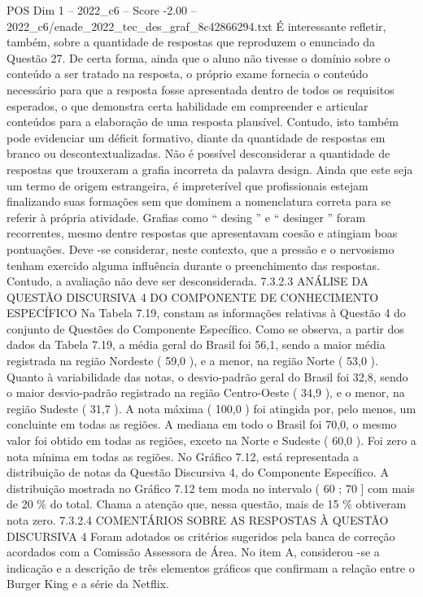 \begin{textsample}{POS Dim 1 – 2022\_c6 – Score -2.00 – 2022\_c6/enade\_2022\_tec\_des\_graf\_8c42866294.txt}
É interessante refletir, também, sobre a quantidade de respostas que reproduzem o enunciado da Questão 27.
De certa forma, ainda que o aluno não tivesse o domínio sobre o conteúdo a ser tratado na resposta, o próprio exame fornecia o conteúdo necessário para que a resposta fosse apresentada dentro de todos os requisitos esperados, o que demonstra certa habilidade em compreender e articular conteúdos para a elaboração de uma resposta plausível.
Contudo, isto também pode evidenciar um déficit formativo, diante da quantidade de respostas em branco ou descontextualizadas.
Não é possível desconsiderar a quantidade de respostas que trouxeram a grafia incorreta da palavra design.
Ainda que este seja um termo de origem estrangeira, é impreterível que profissionais estejam finalizando suas formações sem que dominem a nomenclatura correta para se referir à própria atividade.
Grafias como “ desing ” e “ desinger ” foram recorrentes, mesmo dentre respostas que apresentavam coesão e atingiam boas pontuações.
Deve -se considerar, neste contexto, que a pressão e o nervosismo tenham exercido alguma influência durante o preenchimento das respostas.
Contudo, a avaliação não deve ser desconsiderada. 7.3.2.3 ANÁLISE DA QUESTÃO DISCURSIVA 4 DO COMPONENTE DE CONHECIMENTO ESPECÍFICO Na Tabela 7.19, constam as informações relativas à Questão 4 do conjunto de Questões do Componente Específico.
Como se observa, a partir dos dados da Tabela 7.19, a média geral do Brasil foi 56,1, sendo a maior média registrada na região Nordeste ( 59,0 ), e a menor, na região Norte ( 53,0 ).
Quanto à variabilidade das notas, o desvio-padrão geral do Brasil foi 32,8, sendo o maior desvio-padrão registrado na região Centro-Oeste ( 34,9 ), e o menor, na região Sudeste ( 31,7 ).
A nota máxima ( 100,0 ) foi atingida por, pelo menos, um concluinte em todas as regiões.
A mediana em todo o Brasil foi 70,0, o mesmo valor foi obtido em todas as regiões, exceto na Norte e Sudeste ( 60,0 ).
Foi zero a nota mínima em todas as regiões.
No Gráfico 7.12, está representada a distribuição de notas da Questão Discursiva 4, do Componente Específico.
A distribuição mostrada no Gráfico 7.12 tem moda no intervalo ( 60 ; 70 ] com mais de 20 \% do total.
Chama a atenção que, nessa questão, mais de 15 \% obtiveram nota zero. 7.3.2.4 COMENTÁRIOS SOBRE AS RESPOSTAS À QUESTÃO DISCURSIVA 4 Foram adotados os critérios sugeridos pela banca de correção acordados com a Comissão Assessora de Área.
No item A, considerou -se a indicação e a descrição de três elementos gráficos que confirmam a relação entre o Burger King e a série da Netflix.

\end{textsample}
